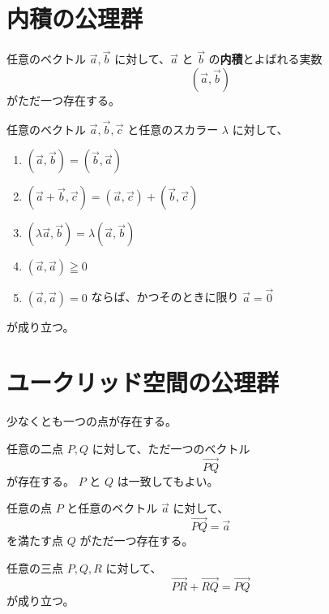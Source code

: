 \section{内積の公理群}

\begin{axm}
  任意のベクトル \(\vec{a},\vec{b}\) に対して、\(\vec{a}\) と \(\vec{b}\) の\textbf{内積}とよばれる実数
  \[(\vec{a},\vec{b})\]
  がただ一つ存在する。
\end{axm}

\begin{axm}\label{251101141801}
  任意のベクトル \(\vec{a},\vec{b},\vec{c}\) と任意のスカラー \(\lambda\) に対して、
  \begin{enumerate}
    \item \((\vec{a},\vec{b})=(\vec{b},\vec{a})\)
    \item \((\vec{a}+\vec{b},\vec{c})=(\vec{a},\vec{c})+(\vec{b},\vec{c})\)
    \item \((\lambda\vec{a},\vec{b})=\lambda(\vec{a},\vec{b})\)
    \item \((\vec{a},\vec{a})\geqq0\)
    \item \((\vec{a},\vec{a})=0\) ならば、かつそのときに限り \(\vec{a}=\vec{0}\)
  \end{enumerate}
  が成り立つ。
\end{axm}

\section{ユークリッド空間の公理群}

\begin{axm}\label{251101143101}
  少なくとも一つの点が存在する。
\end{axm}

\begin{axm}\label{251101133802}
  任意の二点 \(P,Q\) に対して、ただ一つのベクトル
  \[\overrightarrow{PQ}\]
  が存在する。
  \(P\) と \(Q\) は一致してもよい。
\end{axm}

\begin{axm}\label{251101143201}
  任意の点 \(P\) と任意のベクトル \(\vec{a}\) に対して、
  \[\overrightarrow{PQ}=\vec{a}\]
  を満たす点 \(Q\) がただ一つ存在する。
\end{axm}

\begin{axm}
  任意の三点 \(P,Q,R\) に対して、
  \[\overrightarrow{PR}+\overrightarrow{RQ}=\overrightarrow{PQ}\]
  が成り立つ。
\end{axm}

